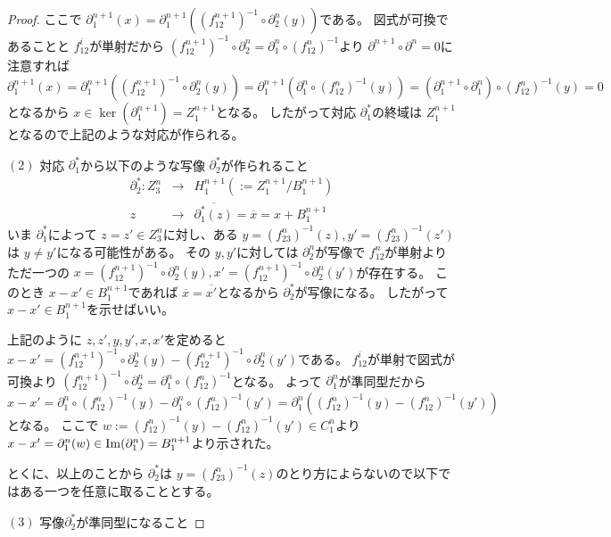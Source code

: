 \documentclass[dvipdfmx]{jsarticle}
\begin{document}
\begin{proof}
  ここで $\partial^{n+1}_1(x) = \partial^{n+1}_1((f_{12}^{n+1})^{-1} \circ \partial^n_2(y))$である。
  図式が可換であることと $f_{12}^i$が単射だから $(f_{12}^{n+1})^{-1} \circ \partial^n_2 = \partial^n_1 \circ (f_{12}^n)^{-1}$より
  $\partial^{n+1} \circ \partial^n = 0$に注意すれば
  $\partial^{n+1}_1(x) = \partial^{n+1}_1((f_{12}^{n+1})^{-1} \circ \partial^n_2(y)) = \partial^{n+1}_1(\partial^n_1 \circ (f_{12}^n)^{-1}(y)) = (\partial^{n+1}_1 \circ \partial^n_1) \circ (f_{12}^n)^{-1}(y) = 0$
  となるから $x \in \ker(\partial^{n+1}_1) = Z^{n+1}_1$となる。
  したがって対応 $\partial^*_1$の終域は $Z^{n+1}_1$となるので上記のような対応が作られる。

  $(2)$
  対応 $\partial^*_1$から以下のような写像 $\partial^*_2$が作られること
  \begin{eqnarray*}
    \partial^*_2 : Z^n_3 & \longrightarrow & H^{n+1}_1 (:= Z^{n+1}_1 / B^{n+1}_1) \\
    z & \longrightarrow & \overline{\partial^*_1(z)} = \overline{x} = x + B^{n+1}_1
  \end{eqnarray*}
  いま $\partial^*_1$によって $z = z' \in Z^n_3$に対し、ある $y = (f_{23}^n)^{-1}(z) , y' = (f_{23}^n)^{-1}(z')$は $y \neq y'$になる可能性がある。
  その $y , y'$に対しては $\partial^n_2$が写像で $f_{12}^n$が単射より
  ただ一つの $x = (f_{12}^{n+1})^{-1} \circ \partial^n_2(y) , x' = (f_{12}^{n+1})^{-1} \circ \partial^n_2(y')$が存在する。
  このとき $x - x' \in B^{n+1}_1$であれば $\overline{x} = \overline{x'}$となるから $\partial^*_2$が写像になる。
  したがって $x - x' \in B^{n+1}_1$を示せばいい。

  上記のように $z , z' , y , y' , x , x'$を定めると
  $x - x' = (f_{12}^{n+1})^{-1} \circ \partial^n_2(y) - (f_{12}^{n+1})^{-1} \circ \partial^n_2(y')$である。
  $f_{12}^i$が単射で図式が可換より $(f_{12}^{n+1})^{-1} \circ \partial^n_2 = \partial^n_1 \circ (f_{12}^n)^{-1}$となる。
  よって $\partial^n_1$が準同型だから $x - x' = \partial^n_1 \circ (f_{12}^n)^{-1}(y) - \partial^n_1 \circ (f_{12}^n)^{-1}(y') = \partial^n_1((f_{12}^n)^{-1}(y) - (f_{12}^n)^{-1}(y'))$となる。
  ここで $w := (f_{12}^n)^{-1}(y) - (f_{12}^n)^{-1}(y') \in C^n_1$より
  $x - x' = \partial^n_1(w) \in \mathop{\mathrm{Im}}\nolimits(\partial^n_1) = B^{n+1}_1$より示された。

  とくに、以上のことから $\partial^*_2$は $y = (f_{23}^n)^{-1}(z)$のとり方によらないので以下ではある一つを任意に取ることとする。

  $(3)$
  写像$\partial^*_2$が準同型になること


\end{proof}
\end{document}
